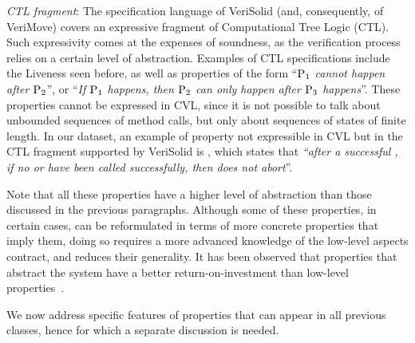 
\emph{CTL fragment}: The specification language of VeriSolid (and, consequently, of VeriMove) covers an expressive fragment of Computational Tree Logic (CTL). Such expressivity comes at the expenses of soundness, as the verification process relies on a certain level of abstraction.
Examples of CTL specifications include the Liveness seen before, as well as properties of the form ``\emph{$\mathrm{P}_1$ cannot happen  after $\mathrm{P}_2$}'', or ``\emph{If $\mathrm{P}_1$ happens, then $\mathrm{P}_2$ can only happen after $\mathrm{P}_3$ happens}''. 
These properties cannot be expressed in CVL, since it is not possible to talk about unbounded sequences of method calls, but only about sequences of states of finite length.
In our dataset, an example of property not expressible in CVL but in the CTL fragment supported by VeriSolid is , which states that \emph{``after a successful , if no  or  have been called successfully, then  does not abort}''.


Note that all these properties have a higher level of abstraction  than those discussed in the previous paragraphs.
Although some of these properties, in certain cases,
can be reformulated in terms of more concrete properties that imply them,   
doing so requires a more advanced knowledge of the low-level aspects contract, and reduces their generality.
It has been observed that properties that abstract the system %
have a better return-on-investment than low-level properties~\cite{Xu24langsec}. %

 We now address specific features of properties that can appear in all previous classes, hence for which a separate discussion is needed.

